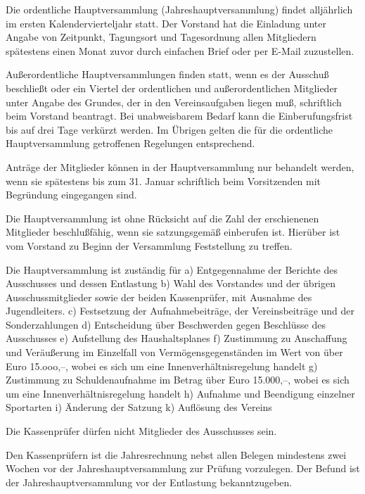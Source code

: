 \documentclass[11pt,a4paper,parskip=half]{scrartcl}
\begin{document}
\begin{contract}
\begin{multicols}{2}
		Die ordentliche Hauptversammlung
		(Jahreshauptversammlung) findet alljährlich im
		ersten Kalendervierteljahr statt. Der Vorstand hat
		die Einladung unter Angabe von Zeitpunkt,
		Tagungsort und Tagesordnung allen Mitgliedern
		spätestens einen Monat zuvor durch einfachen
		Brief oder per E-Mail zuzustellen.
		
		Außerordentliche Hauptversammlungen finden
		statt, wenn es der Ausschuß beschließt oder ein
		Viertel der ordentlichen und außerordentlichen
		Mitglieder unter Angabe des Grundes, der in den
		Vereinsaufgaben liegen muß, schriftlich beim
		Vorstand beantragt. Bei unabweisbarem Bedarf
		kann die Einberufungsfrist bis auf drei Tage
		verkürzt werden.
		Im Übrigen gelten die für die ordentliche
		Hauptversammlung getroffenen Regelungen
		entsprechend.
		
		Anträge der Mitglieder können in der
		Hauptversammlung nur behandelt werden, wenn
		sie spätestens bis zum 31. Januar schriftlich beim
		Vorsitzenden mit Begründung eingegangen sind.
		
		Die Hauptversammlung ist ohne Rücksicht auf
		die Zahl der erschienenen Mitglieder
		beschlußfähig, wenn sie satzungsgemäß
		einberufen ist. Hierüber ist vom Vorstand zu
		Beginn der Versammlung Feststellung zu treffen.
		
		Die Hauptversammlung ist zuständig für
		a) Entgegennahme der Berichte des Ausschusses
		und dessen Entlastung
		b) Wahl des Vorstandes und der übrigen
		Ausschussmitglieder sowie der beiden
		Kassenprüfer, mit Ausnahme des Jugendleiters.
		c) Festsetzung der Aufnahmebeiträge, der
		Vereinsbeiträge und der Sonderzahlungen
		d) Entscheidung über Beschwerden gegen
		Beschlüsse des Ausschusses
		e) Aufstellung des Haushaltsplanes
		f) Zustimmung zu Anschaffung und Veräußerung
		im Einzelfall von Vermögensgegenständen im Wert
		von über Euro 15.ooo,--, wobei es sich um eine
		Innenverhältnisregelung handelt
		g) Zustimmung zu Schuldenaufnahme im Betrag
		über Euro 15.000,--, wobei es sich um eine
		Innenverhältnisregelung handelt
		h) Aufnahme und Beendigung einzelner Sportarten
		i) Änderung der Satzung
		k) Auflösung des Vereins
		
		Die Kassenprüfer dürfen nicht Mitglieder des
		Ausschusses sein.
		
		Den Kassenprüfern ist die Jahresrechnung nebst
		allen Belegen mindestens zwei Wochen vor der
		Jahreshauptversammlung zur Prüfung vorzulegen.
		Der Befund ist der Jahreshauptversammlung vor
		der Entlastung bekanntzugeben.
		

\end{multicols}
\end{contract}
\end{document}
